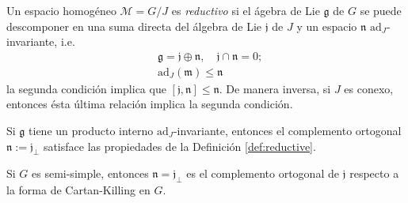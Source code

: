 \begin{mydef}
\label{def:reductive}
Un espacio homog\'{e}neo $\mathcal{M} = G/J$ es \emph{reductivo} si el \'{a}gebra de Lie $\mathfrak{g}$ de $G$ se puede descomponer en una suma directa del \'{a}lgebra de Lie $\mathfrak{j}$ de $J$ y un espacio $\mathfrak{n}$ $\mathrm{ad}_{J}$-invariante, i.e.
%
\begin{align*}
& \mathfrak{g} = \mathfrak{j} \oplus \mathfrak{n}, \quad  \mathfrak{j} \cap \mathfrak{n} = 0; \\
& \mathrm{ad}_{J}(\mathfrak{m}) \leq \mathfrak{n}
\end{align*}
%
la segunda condici\'{o}n implica que $[\mathfrak{j}, \mathfrak{n}] \leq \mathfrak{n}$. De manera inversa, si $J$ es conexo, entonces \'{e}sta \'{u}ltima relaci\'{o}n implica la segunda condici\'{o}n.
\end{mydef}

\begin{obs}
Si $\mathfrak{g}$ tiene un producto interno $\mathrm{ad}_{J}$-invariante, entonces el complemento ortogonal $\mathfrak{n} := \mathfrak{j}_{\perp}$ satisface las propiedades de la Definici\'{o}n \ref{def:reductive}.
\end{obs}

\begin{obs}
Si $G$ es semi-simple, entonces $\mathfrak{n} = \mathfrak{j}_{\perp}$ es el complemento ortogonal de $\mathfrak{j}$ respecto a la forma de Cartan-Killing en $G$.
\end{obs}